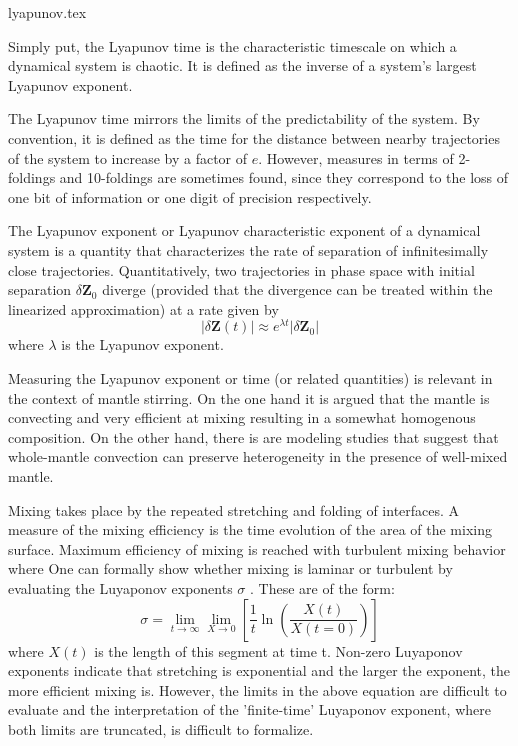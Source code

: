 \begin{flushright} {\tiny {\color{gray} lyapunov.tex}} \end{flushright}


Simply put, the Lyapunov time is the characteristic timescale on which a dynamical system is chaotic.
 It is defined as the inverse of a system's largest Lyapunov exponent.

The Lyapunov time mirrors the limits of the predictability of the system. By convention, it is defined 
as the time for the distance between nearby trajectories of the system to increase by a factor of $e$. 
However, measures in terms of 2-foldings and 10-foldings are sometimes found, since they correspond to 
the loss of one bit of information or one digit of precision respectively.

The Lyapunov exponent or Lyapunov characteristic exponent of a dynamical system is a quantity 
that characterizes the rate of separation of infinitesimally close trajectories. 
Quantitatively, two trajectories in phase space with initial separation $\delta \mathbf{Z}_0$ 
diverge (provided that the divergence can be treated within the linearized approximation) at a rate given by
\[
|\delta \mathbf{Z} (t)|\approx e^{\lambda t}|\delta \mathbf {Z} _{0}| 
\]
where $\lambda$ is the Lyapunov exponent. 

Measuring the Lyapunov exponent or time (or related quantities) is relevant in the context of mantle stirring. 
On the one hand it is argued that the mantle is convecting and very efficient at mixing resulting in a 
somewhat homogenous composition. On the other hand, there is are modeling studies that suggest that
whole-mantle convection can preserve heterogeneity in the presence of well-mixed mantle. 

Mixing takes place by the repeated stretching
and folding of interfaces. A measure of the
mixing efficiency is the time evolution of the area of
the mixing surface. Maximum efficiency of mixing
is reached with turbulent mixing behavior where
One can formally show whether mixing is laminar or turbulent by evaluating the Luyaponov exponents $\sigma$ .
These are of the form:
\[
\sigma = \lim_{t\rightarrow \infty} \lim_{X\rightarrow 0} \left[  \frac{1}{t} \ln \left( \frac{X(t)}{X(t=0)} \right)   \right]
\]
where $X(t)$ is the length of this segment at time t.
Non-zero Luyaponov exponents indicate that
stretching is exponential and the larger the exponent,
the more efficient mixing is.
However, the limits in the above equation are difficult to evaluate and the interpretation 
of the 'finite-time' Luyaponov exponent, where both limits are truncated, is difficult to formalize.


